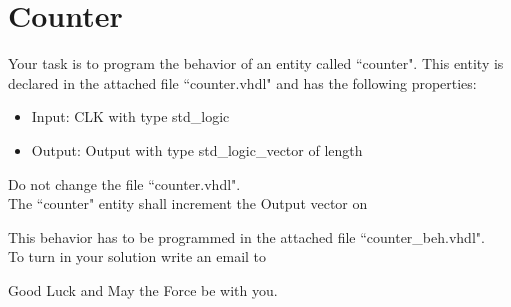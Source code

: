 \documentclass[a4paper,12pt]{article}
\begin{document}
\pagestyle{empty}
\setlength{\parindent}{0em}
\section*{\noindent Counter }
Your task is to program the behavior of an entity called ``counter". This entity is declared in the attached file ``counter.vhdl" and has the following properties:

\begin{itemize}
	\item Input: CLK with type std\_logic
	\item Output: Output with type std\_logic\_vector of length %

\begin{center}
\end{center}

\end{itemize}


Do not change the file ``counter.vhdl".\\

The ``counter" entity shall increment the Output vector on %

This behavior has to be programmed in the attached file ``counter\_beh.vhdl".\\


To turn in your solution write an email to %

\vspace{0.7cm}
Good Luck and May the Force be with you.
\end{document}
